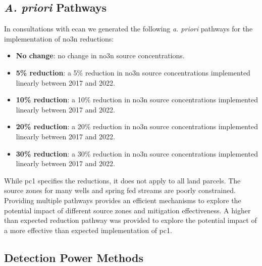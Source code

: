 

\subsection[Pathways]{\textit{A. priori} Pathways} \label{subsec:apriori}

In consultations with \gls{ecan} we generated the following \textit{a. priori} pathways for the implementation of \gls{no3n} reductions:
\begin{itemize}
    \item \textbf{No change}: no change in \gls{no3n} source concentrations.
    \item \textbf{5\% reduction}: a 5\% reduction in \gls{no3n} source concentrations implemented linearly between 2017 and 2022.
    \item \textbf{10\% reduction}: a 10\% reduction in \gls{no3n} source concentrations implemented linearly between 2017 and 2022.
    \item \textbf{20\% reduction}: a 20\% reduction in \gls{no3n} source concentrations implemented linearly between 2017 and 2022.
    \item \textbf{30\% reduction}: a 30\% reduction in \gls{no3n} source concentrations implemented linearly between 2017 and 2022.
\end{itemize}

While \gls{pc1} specifies the reductions, it does not apply to all land parcels. The source zones for many wells and spring fed streams are poorly constrained. Providing multiple pathways provides an efficient mechanisms to explore the potential impact of different source zones and mitigation effectiveness. A higher than expected reduction pathway was provided to explore the potential impact of a more effective than expected implementation of \gls{pc1}.

\subsection[Detection Power Methods] {Detection Power Methods} \label{subsec:detection_power_methods}

